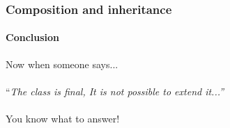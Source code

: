 \begin{frame}
    \frametitle{Composition and inheritance}
    \framesubtitle{Conclusion}

    Now when someone says...\\~\\\pause
    ``\textit{The class is final, It is not possible to extend it...''}\\~\\\pause
    You know what to answer!
\end{frame}
